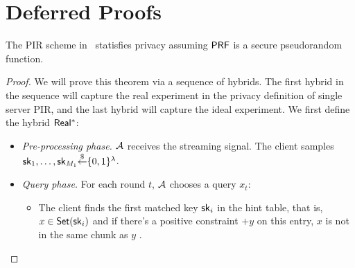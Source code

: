 \section{Deferred Proofs}


\label{sec:deferred}



\begin{theorem}[Privacy]
    The PIR scheme in~ statisfies privacy assuming $\mathsf{PRF}$ is a secure pseudorandom function.
\end{theorem}

\begin{proof}

    We will prove this theorem via a sequence of hybrids. The first hybrid in the sequence will capture the real experiment in the privacy definition of single server PIR, and the last hybrid will capture the ideal experiment.
    We first define the hybrid ${\sf Real^*}$:

    \begin{itemize}
        \item \textit{Pre-processing phase.} $\mathcal{A}$ receives the streaming signal. The client samples $\mathsf{sk}_1,\dots,\mathsf{sk}_{M_1}{\overset{\$}{\leftarrow}}\{0,1\}^\lambda$. %
        \item \textit{Query phase.} For each round $t$, $\mathcal{A}$ chooses a query $x_t$:
        \begin{itemize}
            \item The client finds the first matched key $\mathsf{sk}_i$ in the hint table, that is, $x\in\mathsf{Set}(\mathsf{sk}_i)$ and if there's a positive constraint $+y$ on this entry, $x$ is not in the same chunk as $y$ . 
            

\end{itemize}
\end{itemize}
\end{proof}
